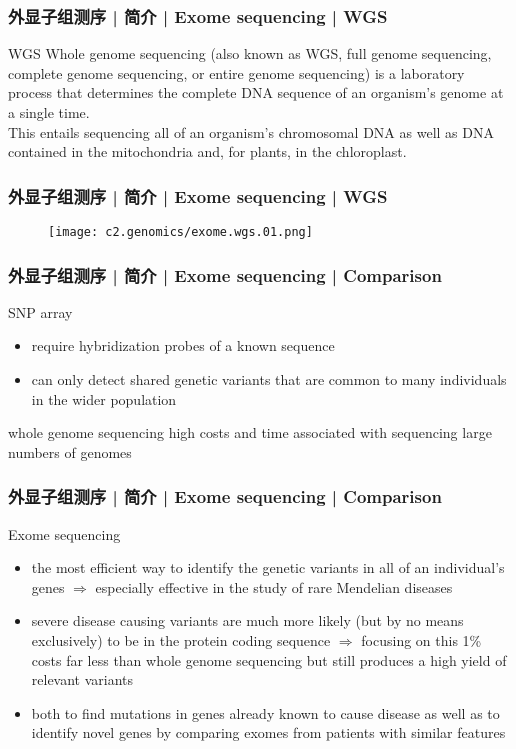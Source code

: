 \begin{frame}
  \frametitle{外显子组测序 | 简介 | Exome sequencing | WGS}
  \begin{block}{WGS}
    Whole genome sequencing (also known as WGS, full genome sequencing, complete genome sequencing, or entire genome sequencing) is a laboratory process that determines the complete DNA sequence of an organism's genome at a single time.\\
    \vspace{1em}
    This entails sequencing all of an organism's chromosomal DNA as well as DNA contained in the mitochondria and, for plants, in the chloroplast.
  \end{block}
\end{frame}

\begin{frame}
  \frametitle{外显子组测序 | 简介 | Exome sequencing | WGS}
  \begin{figure}
    \centering
    \texttt{[image: c2.genomics/exome.wgs.01.png]}
  \end{figure}
\end{frame}

\begin{frame}
  \frametitle{外显子组测序 | 简介 | Exome sequencing | Comparison}
  \begin{block}{SNP array}
    \begin{itemize}
      \item require hybridization probes of a known sequence
      \item can only detect shared genetic variants that are common to many individuals in the wider population
    \end{itemize}
  \end{block}
  \pause
  \begin{block}{whole genome sequencing}
    high costs and time associated with sequencing large numbers of genomes
  \end{block}
\end{frame}

\begin{frame}
  \frametitle{外显子组测序 | 简介 | Exome sequencing | Comparison}
  \begin{block}{Exome sequencing}
    \begin{itemize}
      \item the most efficient way to identify the genetic variants in all of an individual's genes $\Rightarrow$ especially effective in the study of rare Mendelian diseases
      \item severe disease causing variants are much more likely (but by no means exclusively) to be in the protein coding sequence $\Rightarrow$ focusing on this 1\% costs far less than whole genome sequencing but still produces a high yield of relevant variants
      \item both to find mutations in genes already known to cause disease as well as to identify novel genes by comparing exomes from patients with similar features
    \end{itemize}
  \end{block}
\end{frame}


